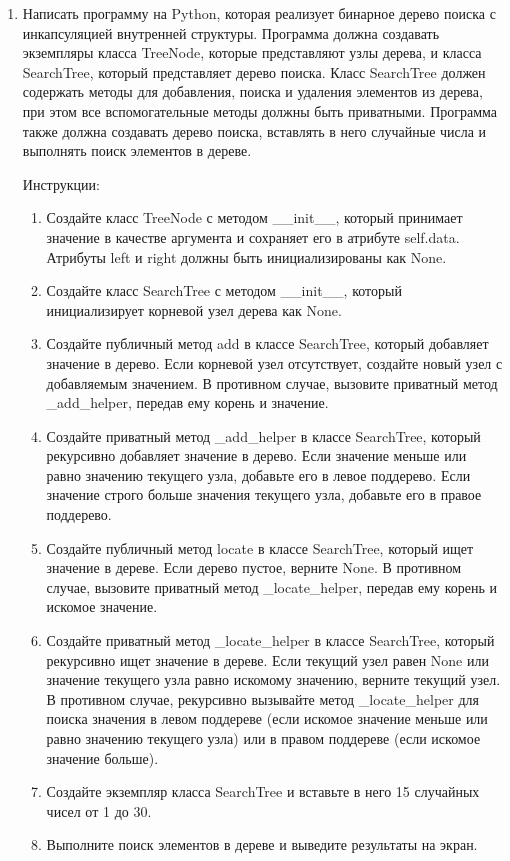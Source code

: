
\begin{enumerate}
\item Написать программу на Python, которая реализует бинарное дерево поиска с инкапсуляцией внутренней структуры. Программа должна создавать экземпляры класса TreeNode, которые представляют узлы дерева, и класса SearchTree, который представляет дерево поиска. Класс SearchTree должен содержать методы для добавления, поиска и удаления элементов из дерева, при этом все вспомогательные методы должны быть приватными. Программа также должна создавать дерево поиска, вставлять в него случайные числа и выполнять поиск элементов в дереве.

Инструкции:
\begin{enumerate}
    \item Создайте класс TreeNode с методом \_\_init\_\_, который принимает значение в качестве аргумента и сохраняет его в атрибуте self.data. Атрибуты left и right должны быть инициализированы как None.
    \item Создайте класс SearchTree с методом \_\_init\_\_, который инициализирует корневой узел дерева как None.
    \item Создайте публичный метод add в классе SearchTree, который добавляет значение в дерево. Если корневой узел отсутствует, создайте новый узел с добавляемым значением. В противном случае, вызовите приватный метод \_add\_helper, передав ему корень и значение.
    \item Создайте приватный метод \_add\_helper в классе SearchTree, который рекурсивно добавляет значение в дерево. Если значение меньше или равно значению текущего узла, добавьте его в левое поддерево. Если значение строго больше значения текущего узла, добавьте его в правое поддерево.
    \item Создайте публичный метод locate в классе SearchTree, который ищет значение в дереве. Если дерево пустое, верните None. В противном случае, вызовите приватный метод \_locate\_helper, передав ему корень и искомое значение.
    \item Создайте приватный метод \_locate\_helper в классе SearchTree, который рекурсивно ищет значение в дереве. Если текущий узел равен None или значение текущего узла равно искомому значению, верните текущий узел. В противном случае, рекурсивно вызывайте метод \_locate\_helper для поиска значения в левом поддереве (если искомое значение меньше или равно значению текущего узла) или в правом поддереве (если искомое значение больше).
    \item Создайте экземпляр класса SearchTree и вставьте в него 15 случайных чисел от 1 до 30.
    \item Выполните поиск элементов в дереве и выведите результаты на экран.
\end{enumerate}


\end{enumerate}
